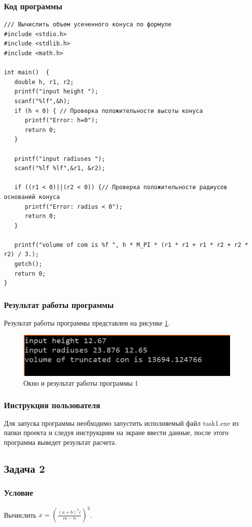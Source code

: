 \documentclass[simple,14pt]{eskdtext}
\begin{document}
	\subsubsection{Код программы}
	\begin{lstlisting}[label=some-code1,caption=Задача 1]
/// Вычислить объем усеченного конуса по формуле
#include <stdio.h>
#include <stdlib.h>
#include <math.h>
		
int main()	{
   double h, r1, r2;
   printf("input height ");
   scanf("%lf",&h);
   if (h < 0) { // Проверка положительности высоты конуса
      printf("Error: h=0");
	  return 0;
   }
  
   printf("input radiuses ");
   scanf("%lf %lf",&r1, &r2);
		
   if ((r1 < 0)||(r2 < 0)) {// Проверка положительности радиусов оснований конуса
      printf("Error: radius < 0");
      return 0;
   }
		
   printf("volume of com is %f ", h * M_PI * (r1 * r1 + r1 * r2 + r2 * r2) / 3.);
   getch();
   return 0;
}
	\end{lstlisting}
	\subsubsection{Результат работы программы}
	Результат работы программы представлен на рисунке \ref{fig:result1}.
	\begin{figure}
\centering
\includegraphics[width=0.7\linewidth]{task_1/result1}
\caption{Окно и результат работы программы 1}
\label{fig:result1}
\end{figure}

	\subsubsection{Инструкция пользователя}
	Для запуска программы необходимо запустить исполняемый файл task1.exe из папки проекта и следуя инструкциям на экране ввести данные, после этого программа выведет результат расчета. 
	   
	\subsection{Задача 2}
	\subsubsection{Условие}
	Вычислить $ x=\left(\frac{(a+b)^{2}c}{m-n}\right)^2 $.
\end{document}
